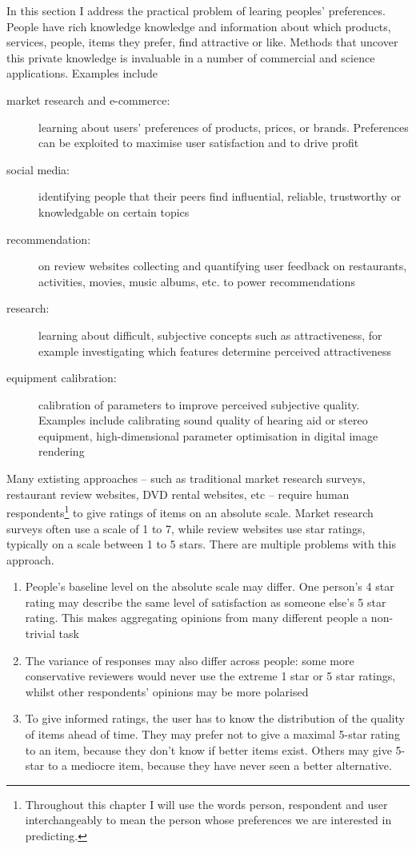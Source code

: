 In this section I address the practical problem of learing peoples' preferences. People have rich knowledge knowledge and information about which products, services, people, items they prefer, find attractive or like. Methods that uncover this private knowledge is invaluable in a number of commercial and science applications. Examples include
\begin{description}
	\item [market research and e-commerce:] learning about users' preferences of products, prices, or brands. Preferences can be exploited to maximise user satisfaction and to drive profit
	\item [social media:] identifying people that their peers find influential, reliable, trustworthy or knowledgable on certain topics
	\item [recommendation:] on review websites collecting and quantifying user feedback on restaurants, activities, movies, music albums, etc. to power recommendations
	\item [research:] learning about difficult, subjective concepts such as attractiveness, for example investigating which features determine perceived attractiveness
	\item [equipment calibration:] calibration of parameters to improve perceived subjective quality. Examples include calibrating sound quality of hearing aid or stereo equipment, high-dimensional parameter optimisation in digital image rendering
\end{description}

Many extisting approaches -- such as traditional market research surveys, restaurant review websites, DVD rental websites, etc -- require human respondents\footnote{Throughout this chapter I will use the words person, respondent and user interchangeably to mean the person whose preferences we are interested in predicting.} to give ratings of items on an absolute scale. Market research surveys often use a scale of 1 to 7, while review websites use star ratings, typically on a scale between 1 to 5 stars. There are multiple problems with this approach.
\begin{enumerate}
	\item People's baseline level on the absolute scale may differ. One person's 4 star rating may describe the same level of satisfaction as someone else's 5 star rating. This makes aggregating opinions from many different people a non-trivial task
	\item The variance of responses may also differ across people: some more conservative reviewers would never use the extreme 1 star or 5 star ratings, whilst other respondents' opinions may be more polarised
	\item To give informed ratings, the user has to know the distribution of the quality of items ahead of time. They may prefer not to give a maximal 5-star rating to an item, because they don't know if better items exist. Others may give 5-star to a mediocre item, because they have never seen a better alternative.
\end{enumerate} 

